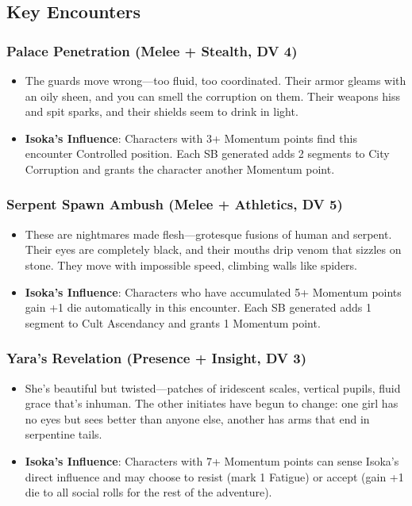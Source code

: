 \documentclass[11pt]{article}
\begin{document}
\subsection{Key Encounters}

\subsubsection{Palace Penetration (Melee + Stealth, DV 4)}
\begin{itemize}[leftmargin=*]
    \item The guards move wrong—too fluid, too coordinated. Their armor gleams with an oily sheen, and you can smell the corruption on them. Their weapons hiss and spit sparks, and their shields seem to drink in light.
    \item \textbf{Isoka's Influence}: Characters with 3+ Momentum points find this encounter Controlled position. Each SB generated adds 2 segments to City Corruption and grants the character another Momentum point.
\end{itemize}

\subsubsection{Serpent Spawn Ambush (Melee + Athletics, DV 5)}
\begin{itemize}[leftmargin=*]
    \item These are nightmares made flesh—grotesque fusions of human and serpent. Their eyes are completely black, and their mouths drip venom that sizzles on stone. They move with impossible speed, climbing walls like spiders.
    \item \textbf{Isoka's Influence}: Characters who have accumulated 5+ Momentum points gain +1 die automatically in this encounter. Each SB generated adds 1 segment to Cult Ascendancy and grants 1 Momentum point.
\end{itemize}

\subsubsection{Yara's Revelation (Presence + Insight, DV 3)}
\begin{itemize}[leftmargin=*]
    \item She's beautiful but twisted—patches of iridescent scales, vertical pupils, fluid grace that's inhuman. The other initiates have begun to change: one girl has no eyes but sees better than anyone else, another has arms that end in serpentine tails.
    \item \textbf{Isoka's Influence}: Characters with 7+ Momentum points can sense Isoka's direct influence and may choose to resist (mark 1 Fatigue) or accept (gain +1 die to all social rolls for the rest of the adventure).
\end{itemize}
\end{document}
